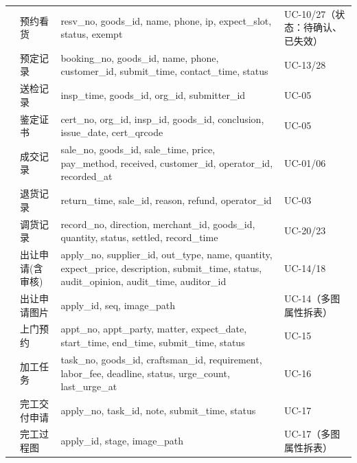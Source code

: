 \begin{longtable}{@{}L{3.2cm} L{2.4cm} L{5.4cm} L{3.5cm}@{}}
 & 预约看货 & resv\_no, goods\_id, name, phone, ip, expect\_slot, status, exempt & UC-10/27（状态：待确认、已失效）\\
 & 预定记录 & booking\_no, goods\_id, name, phone, customer\_id, submit\_time, contact\_time, status & UC-13/28 \\
 & 送检记录 & insp\_time, goods\_id, org\_id, submitter\_id & UC-05 \\
 & 鉴定证书 & cert\_no, org\_id, insp\_id, goods\_id, conclusion, issue\_date, cert\_qrcode & UC-05 \\
 & 成交记录 & sale\_no, goods\_id, sale\_time, price, pay\_method, received, customer\_id, operator\_id, recorded\_at & UC-01/06 \\
 & 退货记录 & return\_time, sale\_id, reason, refund, operator\_id & UC-03 \\
 & 调货记录 & record\_no, direction, merchant\_id, goods\_id, quantity, status, settled, record\_time & UC-20/23 \\
 & 出让申请(含审核) & apply\_no, supplier\_id, out\_type, name, quantity, expect\_price, description, submit\_time, status, audit\_opinion, audit\_time, auditor\_id & UC-14/18 \\
 & 出让申请图片 & apply\_id, seq, image\_path & UC-14（多图属性拆表）\\

 & 上门预约 & appt\_no, appt\_party, matter, expect\_date, start\_time, end\_time, submit\_time, status & UC-15 \\
 & 加工任务 & task\_no, goods\_id, craftsman\_id, requirement, labor\_fee, deadline, status, urge\_count, last\_urge\_at & UC-16 \\
 & 完工交付申请 & apply\_no, task\_id, note, submit\_time, status & UC-17 \\
 & 完工过程图 & apply\_id, stage, image\_path & UC-17（多图属性拆表）\\


\end{longtable}
